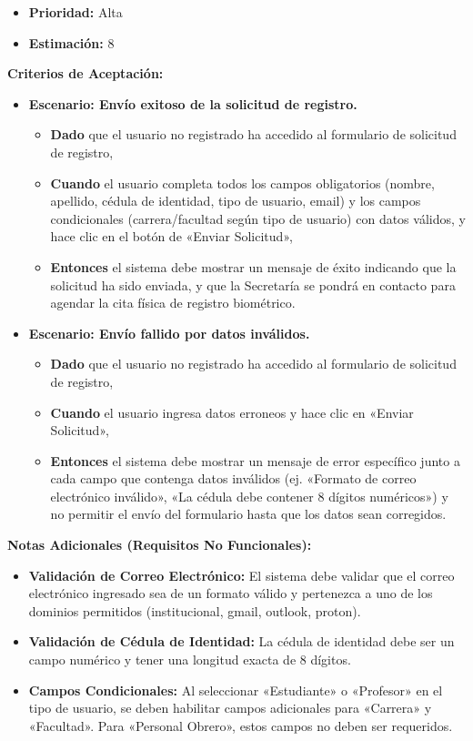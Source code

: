 \documentclass[12pt]{article}
\begin{document}
\begin{itemize}
    \item \textbf{Prioridad:} Alta
    \item \textbf{\textbf{Estimación:}} 8
\end{itemize}

\textbf{Criterios de Aceptación:}
\begin{itemize}
    \item \textbf{Escenario: Envío exitoso de la solicitud de registro.}
    \begin{itemize}
        \item \textbf{Dado} que el usuario no registrado ha accedido al formulario de solicitud de registro,
        \item \textbf{Cuando} el usuario completa todos los campos obligatorios (nombre, apellido, cédula de identidad, tipo de usuario, email) y los campos condicionales (carrera/facultad según tipo de usuario) con datos válidos, y hace clic en el botón de «Enviar Solicitud»,
        \item \textbf{Entonces} el sistema debe mostrar un mensaje de éxito indicando que la solicitud ha sido enviada, y que la Secretaría se pondrá en contacto para agendar la cita física de registro biométrico.
    \end{itemize}

    \item \textbf{Escenario: Envío fallido por datos inválidos.}
    \begin{itemize}
        \item \textbf{Dado} que el usuario no registrado ha accedido al formulario de solicitud de registro,
        \item \textbf{Cuando} el usuario ingresa datos erroneos y hace clic en «Enviar Solicitud»,
        \item \textbf{Entonces} el sistema debe mostrar un mensaje de error específico junto a cada campo que contenga datos inválidos (ej. «Formato de correo electrónico inválido», «La cédula debe contener 8 dígitos numéricos») y no permitir el envío del formulario hasta que los datos sean corregidos.
    \end{itemize}
\end{itemize}

\textbf{Notas Adicionales (Requisitos No Funcionales):}
\begin{itemize}
    \item \textbf{Validación de Correo Electrónico:} El sistema debe validar que el correo \\ electrónico ingresado sea de un formato válido y pertenezca a uno de los dominios permitidos (institucional, gmail, outlook, proton).
    \item \textbf{Validación de Cédula de Identidad:} La cédula de identidad debe ser un campo numérico y tener una longitud exacta de 8 dígitos.
    \item \textbf{Campos Condicionales:} Al seleccionar «Estudiante» o «Profesor» en el tipo de usuario, se deben habilitar campos adicionales para «Carrera» y «Facultad». Para «Personal Obrero», estos campos no deben ser requeridos.
\end{itemize}
\end{document}
